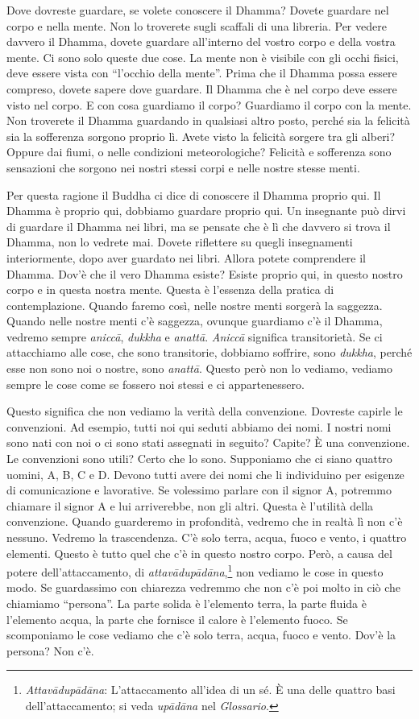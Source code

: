 Dove dovreste guardare, se volete conoscere il Dhamma? Dovete guardare
nel corpo e nella mente. Non lo troverete sugli scaffali di una
libreria. Per vedere davvero il Dhamma, dovete guardare all'interno del
vostro corpo e della vostra mente. Ci sono solo queste due cose. La
mente non è visibile con gli occhi fisici, deve essere vista con
``l'occhio della mente''. Prima che il Dhamma possa essere compreso,
dovete sapere dove guardare. Il Dhamma che è nel corpo deve essere visto
nel corpo. E con cosa guardiamo il corpo? Guardiamo il corpo con la
mente. Non troverete il Dhamma guardando in qualsiasi altro posto,
perché sia la felicità sia la sofferenza sorgono proprio lì. Avete visto
la felicità sorgere tra gli alberi? Oppure dai fiumi, o nelle condizioni
meteorologiche? Felicità e sofferenza sono sensazioni che sorgono nei
nostri stessi corpi e nelle nostre stesse menti.

Per questa ragione il Buddha ci dice di conoscere il Dhamma proprio qui.
Il Dhamma è proprio qui, dobbiamo guardare proprio qui. Un insegnante
può dirvi di guardare il Dhamma nei libri, ma se pensate che è lì che
davvero si trova il Dhamma, non lo vedrete mai. Dovete riflettere su
quegli insegnamenti interiormente, dopo aver guardato nei libri. Allora
potete comprendere il Dhamma. Dov'è che il vero Dhamma esiste? Esiste
proprio qui, in questo nostro corpo e in questa nostra mente. Questa è
l'essenza della pratica di contemplazione. Quando faremo così, nelle
nostre menti sorgerà la saggezza. Quando nelle nostre menti c'è
saggezza, ovunque guardiamo c'è il Dhamma, vedremo sempre \emph{aniccā},
\emph{dukkha} e \emph{anattā}. \emph{Aniccā} significa transitorietà. Se
ci attacchiamo alle cose, che sono transitorie, dobbiamo soffrire, sono
\emph{dukkha}, perché esse non sono noi o nostre, sono \emph{anattā}.
Questo però non lo vediamo, vediamo sempre le cose come se fossero noi
stessi e ci appartenessero.

Questo significa che non vediamo la verità della convenzione. Dovreste
capirle le convenzioni. Ad esempio, tutti noi qui seduti abbiamo dei
nomi. I nostri nomi sono nati con noi o ci sono stati assegnati in
seguito? Capite? È una convenzione. Le convenzioni sono utili? Certo che
lo sono. Supponiamo che ci siano quattro uomini, A, B, C e D. Devono
tutti avere dei nomi che li individuino per esigenze di comunicazione e
lavorative. Se volessimo parlare con il signor A, potremmo chiamare il
signor A e lui arriverebbe, non gli altri. Questa è l'utilità della
convenzione. Quando guarderemo in profondità, vedremo che in realtà lì
non c'è nessuno. Vedremo la trascendenza. C'è solo terra, acqua, fuoco e
vento, i quattro elementi. Questo è tutto quel che c'è in questo nostro
corpo. Però, a causa del potere dell'attaccamento, di
\emph{attavādupādāna},\footnote{\emph{Attavādupādāna}: L'attaccamento
  all'idea di un sé. È una delle quattro basi dell'attaccamento; si
  veda \emph{upādāna} nel \emph{Glossario}.} non vediamo le cose in
questo modo. Se guardassimo con chiarezza vedremmo che non c'è poi molto
in ciò che chiamiamo ``persona''. La parte solida è l'elemento terra, la
parte fluida è l'elemento acqua, la parte che fornisce il calore è
l'elemento fuoco. Se scomponiamo le cose vediamo che c'è solo terra,
acqua, fuoco e vento. Dov'è la persona? Non c'è.

